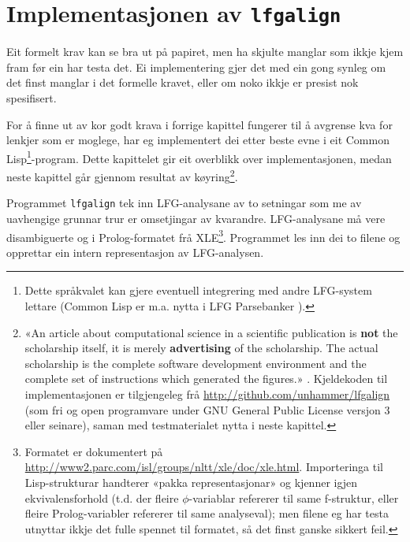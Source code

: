 \documentclass[12pt,a4paper,oneside,draft]{report}
\begin{document}
\chapter{Implementasjonen av \texttt{lfgalign}}
\label{sec-4}

\label{SEC:implementasjon}


Eit formelt krav kan se bra ut på papiret, men ha skjulte manglar som
ikkje kjem fram før ein har testa det.  Ei implementering gjer det med
ein gong synleg om det finst manglar i det formelle kravet, eller om
noko ikkje er presist nok spesifisert.

For å finne ut av kor godt krava i forrige kapittel fungerer til å
avgrense kva for lenkjer som er moglege, har eg implementert dei etter
beste evne i eit Common Lisp\footnote{Dette språkvalet kan gjere eventuell integrering med andre
        LFG-system lettare (Common Lisp er m.a. nytta i LFG
        Parsebanker \citep{rosen2009lpt}). }-program. Dette kapittelet gir eit
overblikk over implementasjonen, medan neste kapittel går gjennom
resultat av køyring\footnote{«An article about computational science in a scientific
       publication is \textbf{not} the scholarship itself, it is
       merely \textbf{advertising} of the scholarship. The actual
       scholarship is the complete software development environment
       and the complete set of instructions which generated the
       figures.» \citep[Jon Claerbout, i][s.~7--8]{stodden2009err}.
       Kjeldekoden til implementasjonen er tilgjengeleg frå
       \href{http://github.com/unhammer/lfgalign}{http://github.com/unhammer/lfgalign} (som fri og open
       programvare under GNU General Public License versjon 3 eller
       seinare), saman med testmaterialet nytta i neste kapittel. }.

Programmet \texttt{lfgalign} tek inn LFG-analysane av to
setningar som me av uavhengige grunnar trur er omsetjingar av
kvarandre. LFG-analysane må vere disambiguerte og i Prolog-formatet
frå XLE\footnote{Formatet er dokumentert på
       \href{http://www2.parc.com/isl/groups/nltt/xle/doc/xle.html}{http://www2.parc.com/isl/groups/nltt/xle/doc/xle.html}. Importeringa
       til Lisp-strukturar handterer «pakka representasjonar» og
       kjenner igjen ekvivalensforhold (t.d. der fleire
       $\phi$-variablar refererer til same f\hyp{}struktur, eller fleire
       Prolog-variabler refererer til same analyseval); men filene eg
       har testa utnyttar ikkje det fulle spennet til formatet, så det
       finst ganske sikkert feil. }. Programmet les inn dei to filene og opprettar ein
intern representasjon av LFG-analysen.  
\end{document}
